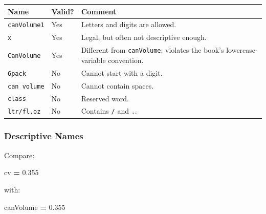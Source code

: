 \documentclass[
]{article}
\newenvironment{Shaded}{\begin{snugshade}}{\end{snugshade}}
\newcommand{\FloatTok}[1]{\textcolor[rgb]{0.00,0.00,0.81}{#1}}
\newcommand{\NormalTok}[1]{#1}
\newcommand{\OperatorTok}[1]{\textcolor[rgb]{0.81,0.36,0.00}{\textbf{#1}}}
\newcounter{none} %
\begin{document}
{\def\LTcaptype{none} %
\begin{longtable}[]{@{}
  >{\raggedright\arraybackslash}p{}
  >{\raggedleft\arraybackslash}p{}
  >{\raggedright\arraybackslash}p{}@{}}
\toprule\noalign{}
\begin{minipage}[b]{\linewidth}\raggedright
Name
\end{minipage} & \begin{minipage}[b]{\linewidth}\raggedleft
Valid?
\end{minipage} & \begin{minipage}[b]{\linewidth}\raggedright
Comment
\end{minipage} \\
\midrule\noalign{}
\endhead
\bottomrule\noalign{}
\endlastfoot
\texttt{canVolume1} & Yes & Letters and digits are allowed. \\
\texttt{x} & Yes & Legal, but often not descriptive enough. \\
\texttt{CanVolume} & Yes & Different from \texttt{canVolume}; violates
the book's lowercase-variable convention. \\
\texttt{6pack} & No & Cannot start with a digit. \\
\texttt{can\ volume} & No & Cannot contain spaces. \\
\texttt{class} & No & Reserved word. \\
\texttt{ltr/fl.oz} & No & Contains \texttt{/} and \texttt{.}. \\
\end{longtable}
}

\subsubsection{Descriptive Names}\label{descriptive-names}

Compare:

\begin{Shaded}
\begin{Highlighting}[]
\NormalTok{cv }\OperatorTok{=} \FloatTok{0.355}
\end{Highlighting}
\end{Shaded}

with:

\begin{Shaded}
\begin{Highlighting}[]
\NormalTok{canVolume }\OperatorTok{=} \FloatTok{0.355}
\end{Highlighting}
\end{Shaded}
\end{document}
